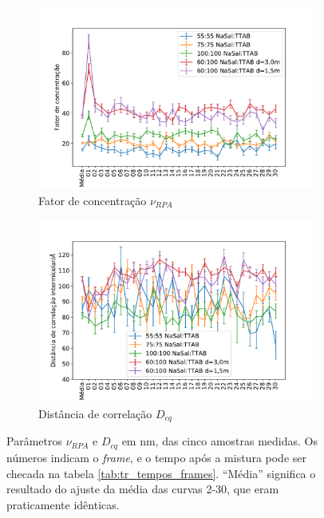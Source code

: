 	\begin{figure}
		\begin{subfigure}[t]{0.5\textwidth}
			\centering
			\includegraphics[width=\textwidth]{imagens/saxs/param_nu_rpa}
			\caption{Fator de concentração \(\nu_{RPA}\)}
			\label{fig:param_nurpa}
		\end{subfigure} %
		\begin{subfigure}[t]{0.5\textwidth}
			\centering
			\includegraphics[width=\textwidth]{imagens/saxs/param_d_cq}
			\caption{Distância de correlação \(D_{cq}\)}
			\label{fig:param_dcq}
		\end{subfigure}
		\caption{Parâmetros \(\nu_{RPA}\) e \(D_{cq}\) em nm, das cinco amostras medidas. Os números indicam o \emph{frame}, e o tempo após a mistura pode ser checada na tabela \ref{tab:tr_tempos_frames}. ``Média'' significa o resultado do ajuste da média das curvas 2-30, que eram praticamente idênticas.}
		\label{fig:params_nurpa_dcq}
	\end{figure}

